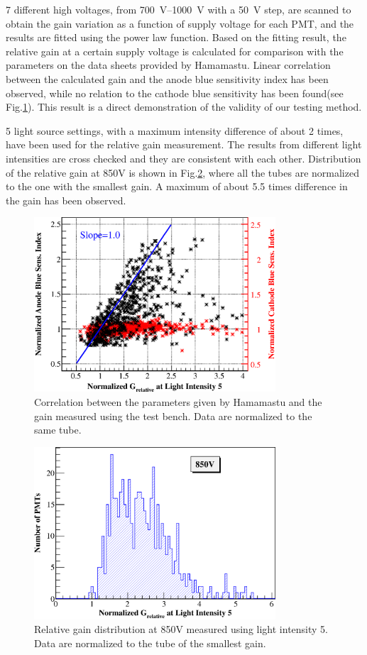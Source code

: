 \documentclass[preprint, times]{elsarticle}
\begin{document}
7 different high voltages, from \SIrange{700}{1000}{\volt} with a \SI{50}{\volt} step, are scanned to obtain the gain variation as a function of supply voltage for each PMT, and the results are fitted using the power law function.
Based on the fitting result, the relative gain at a certain supply voltage is calculated for comparison with the parameters on the data sheets provided by Hamamastu.
Linear correlation between the calculated gain and the anode blue sensitivity index has been observed, while no relation to the cathode blue sensitivity has been found(see Fig.\ref{fig:FIG8}).
This result is a direct demonstration of the validity of our testing method.

5 light source settings, with a maximum intensity difference of about 2 times, have been used for the relative gain measurement.
The results from different light intensities are cross checked and they are consistent with each other.
Distribution of the relative gain at 850V is shown in Fig.\ref{fig:FIG9}, where all the tubes are normalized to the one with the smallest gain. 
A maximum of about 5.5 times difference in the gain has been observed.

\begin{figure}[h!]
 \centering
 \includegraphics[width=90mm]{FIG8}
\caption{Correlation between the parameters given by Hamamastu and the gain measured using the test bench.
Data are normalized to the same tube.}
\label{fig:FIG8}
\end{figure} 

\begin{figure}[h!]
 \centering
 \includegraphics[width=90mm]{FIG9}
\caption{Relative gain distribution at 850V measured using light intensity 5.
Data are normalized to the tube of the smallest gain.}
\label{fig:FIG9}
\end{figure}
\end{document}
